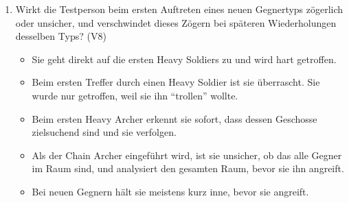 \documentclass[../Main.tex]{subfiles}
\begin{document}
\begin{enumerate}[label=\textbf{B\arabic*}, leftmargin=1.5cm, itemsep=0.8em, resume]
    \item Wirkt die Testperson beim ersten Auftreten eines neuen Gegnertyps zögerlich oder unsicher, und verschwindet dieses Zögern bei späteren Wiederholungen desselben Typs? \hfill (V8)
    \begin{itemize}[nosep]
        \item Sie geht direkt auf die ersten Heavy Soldiers zu und wird hart getroffen.
        \item Beim ersten Treffer durch einen Heavy Soldier ist sie überrascht. Sie wurde nur getroffen, weil sie ihn \enquote{trollen} wollte.
        \item Beim ersten Heavy Archer erkennt sie sofort, dass dessen Geschosse zielsuchend sind und sie verfolgen.
        \item Als der Chain Archer eingeführt wird, ist sie unsicher, ob das alle Gegner im Raum sind, und analysiert den gesamten Raum, bevor sie ihn angreift.
        \item Bei neuen Gegnern hält sie meistens kurz inne, bevor sie angreift.
    \end{itemize}
\end{enumerate}
\end{document}
